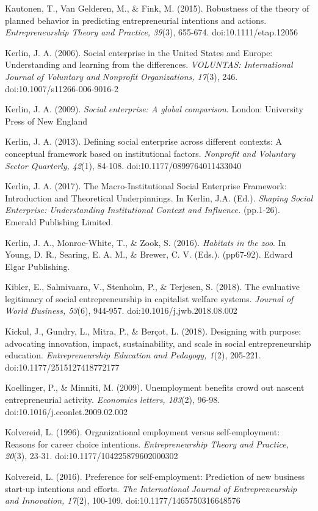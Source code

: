 \documentclass{article}
\begin{document}
Kautonen, T., Van Gelderen, M., \& Fink, M. (2015). Robustness of the theory of planned behavior in predicting entrepreneurial intentions and actions. \emph{Entrepreneurship Theory and Practice, 39}(3), 655-674. doi:10.1111/etap.12056

Kerlin, J. A. (2006). Social enterprise in the United States and Europe: Understanding and learning from the differences. \emph{VOLUNTAS: International Journal of Voluntary and }\emph{Nonprofit}\emph{ Organizations, 17}(3), 246. doi:10.1007/s11266-006-9016-2

Kerlin, J. A. (2009). \emph{Social enterprise: A global comparison}. London: University Press of New England

Kerlin, J. A. (2013). Defining social enterprise across different contexts: A conceptual framework based on institutional factors. \emph{Nonprofit}\emph{ and Voluntary Sector Quarterly, 42}(1), 84-108. doi:10.1177/0899764011433040

Kerlin, J. A. (2017). The Macro-Institutional Social Enterprise Framework: Introduction and Theoretical Underpinnings. In Kerlin, J.A. (Ed.). \emph{Shaping Social }\emph{Enterprise: Understanding Institutional Context and Influence. }(pp.1-26). Emerald Publishing Limited.

Kerlin, J. A., Monroe-White, T., \& Zook, S. (2016). \emph{Habitats in the zoo}. In Young, D. R., Searing, E. A. M., \& Brewer, C. V. (Eds.). (pp67-92). Edward Elgar Publishing.

Kibler, E., Salmivaara, V., Stenholm, P., \& Terjesen, S. (2018). The evaluative legitimacy of social entrepreneurship in capitalist welfare systems. \emph{Journal of World Business, 53}(6), 944-957. doi:10.1016/j.jwb.2018.08.002

Kickul, J., Gundry, L., Mitra, P., \& Berçot, L. (2018). Designing with purpose: advocating innovation, impact, sustainability, and scale in social entrepreneurship education. \emph{Entrepreneurship Education and Pedagogy, 1}(2), 205-221. doi:10.1177/2515127418772177

Koellinger, P., \& Minniti, M. (2009). Unemployment benefits crowd out nascent entrepreneurial activity. \emph{Economics letters, 103}(2), 96-98. doi:10.1016/j.econlet.2009.02.002

Kolvereid, L. (1996). Organizational employment versus self-employment: Reasons for career choice intentions. \emph{Entrepreneurship Theory and Practice, 20}(3), 23-31. doi:10.1177/104225879602000302

Kolvereid, L. (2016). Preference for self-employment: Prediction of new business start-up intentions and efforts. \emph{The International Journal of Entrepreneurship and Innovation, 17}(2), 100-109. doi:10.1177/1465750316648576
\end{document}
